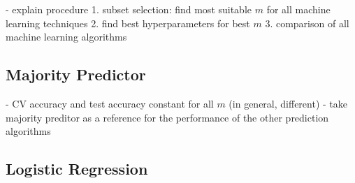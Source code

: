 - explain procedure
1. subset selection: find most suitable $m$ for all machine learning techniques
2. find best hyperparameters for best $m$
3. comparison of all machine learning algorithms

\subsection{Majority Predictor}
- CV accuracy and test accuracy constant for all $m$ (in general, different)
- take majority preditor as a reference for the performance of the other prediction algorithms

\subsection{Logistic Regression}
